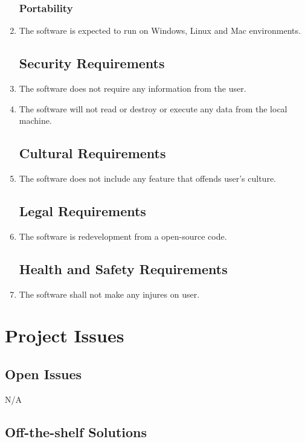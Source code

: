 \documentclass[10pt]{article}
\begin{document}
\begin{enumerate}
\subsubsection{Portability}

\item The software is expected to run on Windows, Linux and Mac environments.

\subsection{Security Requirements}

\item The software does not require any information from the user.\\
\item  The software will not read or destroy or execute any data from the local machine.

\subsection{Cultural Requirements}

\item The software does not include any feature that offends user's culture.

\subsection{Legal Requirements}

\item The software is redevelopment from a open-source code.

\subsection{Health and Safety Requirements}

\item The software shall not make any injures on user.
\end{enumerate}
\section{Project Issues}
\subsection{Open Issues}
N/A
\subsection{Off-the-shelf Solutions}
\end{document}
